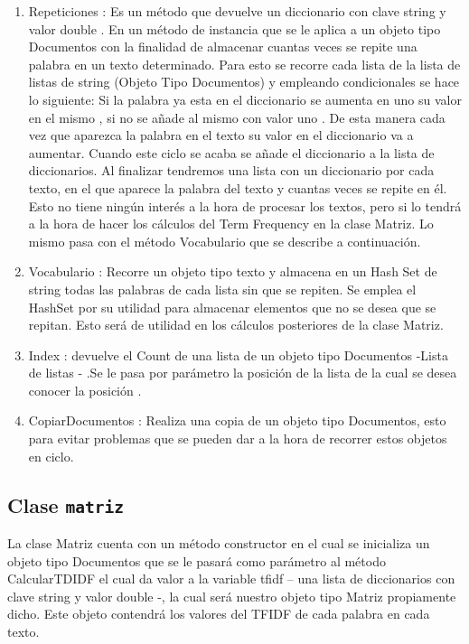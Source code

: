 \documentclass[10pt]{extarticle}
\begin{document}
\begin{enumerate}
   	\item  Repeticiones :  Es un método que devuelve un diccionario con 
   	clave string y valor  double . En un método de instancia que se le aplica a un objeto tipo 
   	Documentos con la finalidad de almacenar cuantas veces se repite una palabra en un texto 
   	determinado. Para esto se recorre cada lista de la lista de listas de string (Objeto Tipo 
   	Documentos) y  empleando condicionales se hace lo siguiente: Si la palabra ya esta en el 
   	diccionario se aumenta en uno su valor en el mismo , si no se añade al mismo con valor uno . De 
   	esta manera cada vez que aparezca la palabra en el texto su valor en el diccionario va a aumentar. 
   	Cuando este ciclo se acaba se añade el diccionario a la lista de diccionarios. Al finalizar tendremos 
   	una lista con un diccionario por cada texto, en el que aparece la palabra del texto y cuantas veces 
   	se repite en él. Esto no tiene ningún interés a la hora de procesar los textos, pero si lo tendrá a la 
   	hora de hacer los cálculos del Term Frequency en la clase Matriz. Lo mismo pasa con el método 
   	Vocabulario que se describe a continuación. 
    \item Vocabulario :	Recorre un objeto tipo texto y almacena en un Hash Set de string todas las palabras 
   	de cada lista sin que se repiten. Se emplea el HashSet por su utilidad para almacenar elementos 
   	que no se desea que se repitan. Esto será de utilidad en los cálculos posteriores de la clase Matriz. 
   	\item  Index :  devuelve el Count de una lista de un objeto tipo 
   	Documentos -Lista de listas - .Se le pasa por parámetro la posición de la lista de la cual se desea 
   	conocer la posición . 
   	\item  CopiarDocumentos :  Realiza una copia de un objeto tipo 
   	Documentos, esto para evitar problemas que se pueden dar a la hora de recorrer estos objetos en 
   	ciclo.
   \end{enumerate}
   
   
    \subsection{Clase \texttt{matriz}}\label{sub:matriz}
    
    La clase Matriz cuenta con un método constructor en el cual se inicializa un objeto tipo 
    Documentos que se le pasará como parámetro al método CalcularTDIDF el cual da valor a la 
    variable tfidf – una lista de diccionarios con clave string y valor double -, la cual será nuestro 
    objeto tipo Matriz propiamente dicho. Este objeto contendrá los valores del TFIDF de cada palabra 
    en cada texto.
    
\end{document}
